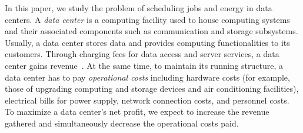 \documentclass[conference]{IEEEtran}
\begin{document}
In this paper, we study the problem of scheduling jobs and energy in data centers. A \emph{data center} is a computing facility used to house computing systems and their associated components such as communication and storage subsystems. Usually, a data center stores data and provides computing functionalities to its customers. Through charging fees for data access and server services, a data center gains revenue~\cite{amazonprice}. At the same time, to maintain its running structure, a data center has to pay \emph{operational costs} including hardware costs (for example, those of upgrading computing and storage devices and air conditioning facilities), electrical bills for power supply, network connection costs, and personnel costs. To maximize a data center's net profit, we expect to increase the revenue gathered and simultaneously decrease the operational costs paid.
\end{document}
